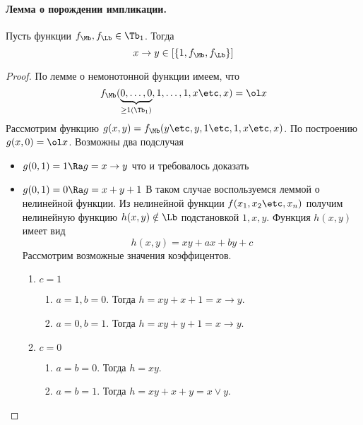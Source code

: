 \documentclass[unicode, 10pt, a4paper, oneside, fleqn]{article}
\begin{document}
\paragraph{Лемма о порождении импликации.\\}
\begin{lemma}
  Пусть функции $\fM,\fL \in \Tb_1$. Тогда
  \begin{displaymath}
    x\to y \in \cls{1,\fM,\fL}
  \end{displaymath}
\end{lemma}
\begin{proof}
  По лемме о немонотонной функции имеем, что \WHY
  \begin{displaymath}
    \fM(\underbrace{0,\ldots,0}_{\ge 1(\Tb_1)},1,\ldots,1,x\etc,x)=\ol x
  \end{displaymath}
  Рассмотрим функцию $g(x,y)=\fM(y\etc,y,1\etc,1,x\etc,x)$. По построению $g(x,0)=\ol x$.
  Возможны два подслучая
  \begin{itemize}
    \item 
      \begin{math}
        g(0,1)=1 \Ra g=x\to y
      \end{math}
      что и требовалось доказать
    \item
      \begin{math}
        g(0,1) = 0 \Ra g= x+y+1
      \end{math}
      В таком случае воспользуемся леммой о нелинейной функции.
      Из нелинейной функции $f(\set[x]{n})$ получим нелинейную функцию $h(x,y)\notin\Lb$ 
      подстановкой $1,x,y$.
      Функция $h(x,y)$ имеет вид
      \begin{displaymath}
        h(x,y) = xy+ax+by+c
      \end{displaymath}
      Рассмотрим возможные значения коэффицентов.
      \begin{enumerate}
        \item  $c=1$
          \begin{enumerate}
            \item $a=1,b=0$. Тогда $h=xy+x+1=x\to y$.
            \item $a=0,b=1$. Тогда $h=xy+y+1=x\to y$.
          \end{enumerate}
        \item $c=0$
          \begin{enumerate}
            \item $a=b=0$. Тогда $h=xy$.
            \item $a=b=1$. Тогда $h=xy+x+y=x\vee y$.
          \end{enumerate}
      \end{enumerate}
  \end{itemize}
\end{proof}
\end{document}
